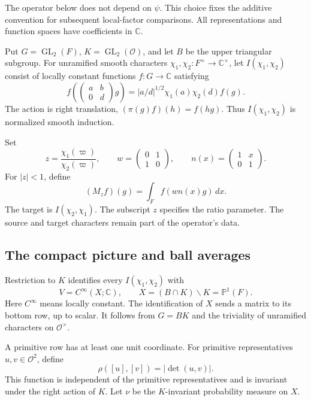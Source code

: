 The operator below does not depend on $\psi$.
This choice fixes the additive convention for subsequent local-factor comparisons.
All representations and function spaces have coefficients in $\mathbb C$.

Put $G=\operatorname{GL}_2(F)$, $K=\operatorname{GL}_2(\mathcal O)$,
and let $B$ be the upper triangular subgroup.
For unramified smooth characters $\chi_1,\chi_2:F^\times\to\mathbb C^\times$,
let $I(\chi_1,\chi_2)$ consist of locally constant functions $f:G\to\mathbb C$
satisfying
\[
 f\left(\begin{pmatrix}a&b\\0&d\end{pmatrix}g\right)
 =|a/d|^{1/2}\chi_1(a)\chi_2(d)f(g).
\]
The action is right translation, $(\pi(g)f)(h)=f(hg)$.
Thus $I(\chi_1,\chi_2)$ is normalized smooth induction.

Set
\[
 z=\frac{\chi_1(\varpi)}{\chi_2(\varpi)},\qquad
 w=\begin{pmatrix}0&1\\1&0\end{pmatrix},\qquad
 n(x)=\begin{pmatrix}1&x\\0&1\end{pmatrix}.
\]
For $|z|<1$, define
\begin{equation}
\label{v4-arith:ic:eis:raw-intertwiner}
 (M_zf)(g)=\int_F f(wn(x)g)\,dx.
\end{equation}
The target is $I(\chi_2,\chi_1)$.
The subscript $z$ specifies the ratio parameter.
The source and target characters remain part of the operator's data.

\subsection{The compact picture and ball averages}

Restriction to $K$ identifies every $I(\chi_1,\chi_2)$ with
\[
 V=C^\infty(X;\mathbb C),\qquad X=(B\cap K)\backslash K=\mathbb P^1(F).
\]
Here $C^\infty$ means locally constant.
The identification of $X$ sends a matrix to its bottom row, up to scalar.
It follows from $G=BK$ and the triviality of unramified characters on
$\mathcal O^\times$.

A primitive row has at least one unit coordinate.
For primitive representatives $u,v\in\mathcal O^2$, define
\[
 \rho([u],[v])=|\det(u,v)|.
\]
This function is independent of the primitive representatives and is
invariant under the right action of $K$.
Let $\nu$ be the $K$-invariant probability measure on $X$.

